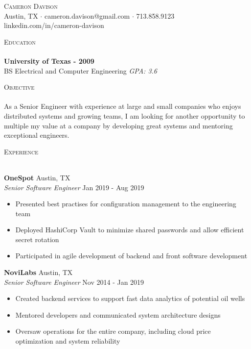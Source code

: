 \documentclass[a4paper]{article}
\newcommand{\lineunder} {
    \vspace*{-8pt} \\
    \hspace*{-18pt} \hrulefill \\
}
\newcommand{\header} [1] {
    {\hspace*{-18pt}\vspace*{6pt} \textsc{#1}}
    \vspace*{-6pt} \lineunder
}
\begin{document}
\vspace*{-40pt}

\vspace*{-10pt}
\begin{center}
	{\Huge \scshape {Cameron Davison}}\\
	Austin, TX $\cdot$ cameron.davison@gmail.com $\cdot$ 713.858.9123\\
    linkedin.com/in/cameron-davison\\
\end{center}

\header{Education}
\textbf{University of Texas - 2009}\\
BS Electrical and Computer Engineering \textit{GPA: 3.6}\\
\vspace{2mm}

\header{Objective}
As a Senior Engineer with experience at large and small companies who enjoys distributed systems and growing teams, I
am looking for another opportunity to multiple my value at a company by developing great systems and mentoring
exceptional engineers.
\vspace{2mm}

\header{Experience}
\vspace{1mm}

\textbf{OneSpot} \hfill Austin, TX\\
\textit{Senior Software Engineer} \hfill Jan 2019 - Aug 2019\\
\vspace{-1mm}
\begin{itemize} \itemsep 1pt
\item Presented best practises for configuration management to the engineering team
\item Deployed HashiCorp Vault to minimize shared passwords and allow efficient secret rotation
\item Participated in agile development of backend and front software development
\end{itemize}

\textbf{NoviLabs} \hfill Austin, TX\\
\textit{Senior Software Engineer} \hfill Nov 2014 - Jan 2019\\
\vspace{-1mm}
\begin{itemize} \itemsep 1pt
\item Created backend services to support fast data analytics of potential oil wells
\item Mentored developers and communicated system architecture designs
\item Oversaw operations for the entire company, including cloud price optimization and system reliability
\end{itemize}
\end{document}
